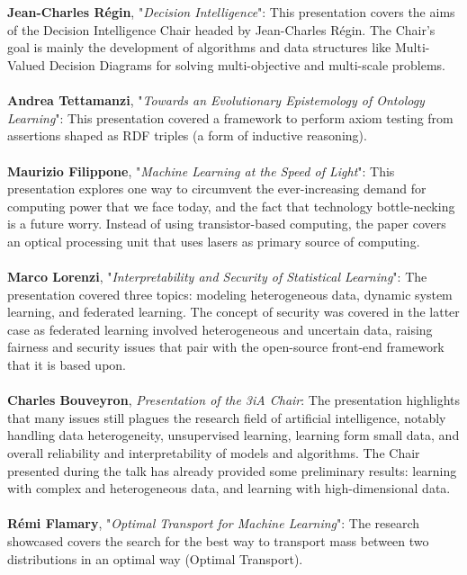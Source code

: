 \documentclass[a4paper]{article}
\begin{document}
\\\\
\textbf{Jean-Charles Régin}, "\textit{Decision Intelligence}": This presentation covers the aims of the Decision Intelligence Chair headed by Jean-Charles Régin. The Chair's goal is mainly the development of algorithms and data structures like Multi-Valued Decision Diagrams for solving multi-objective and multi-scale problems.
\\\\
\textbf{Andrea Tettamanzi}, "\textit{Towards an Evolutionary Epistemology of Ontology Learning}": This presentation covered a framework to perform axiom testing from assertions shaped as RDF triples (a form of inductive reasoning).
\\\\
\textbf{Maurizio Filippone}, "\textit{Machine Learning at the Speed of Light}": This presentation explores one way to circumvent the ever-increasing demand for computing power that we face today, and the fact that technology bottle-necking is a future worry. Instead of using transistor-based computing, the paper covers an optical processing unit that uses lasers as primary source of computing.
\\\\
\textbf{Marco Lorenzi}, "\textit{Interpretability and Security of Statistical Learning}": The presentation covered three topics: modeling heterogeneous data, dynamic system learning, and federated learning. The concept of security was covered in the latter case as federated learning involved heterogeneous and uncertain data, raising fairness and security issues that pair with the open-source front-end framework that it is based upon.
\\\\
\textbf{Charles Bouveyron}, \textit{Presentation of the 3iA Chair}: The presentation highlights that many issues still plagues the research field of artificial intelligence, notably handling data heterogeneity, unsupervised learning, learning form small data, and overall reliability and interpretability of models and algorithms. The Chair presented during the talk has already provided some preliminary results: learning with complex and heterogeneous data, and learning with high-dimensional data.
\\\\
\textbf{Rémi Flamary}, "\textit{Optimal Transport for Machine Learning}": The research showcased covers the search for the best way to transport mass between two distributions in an optimal way (Optimal Transport). 
\end{document}
